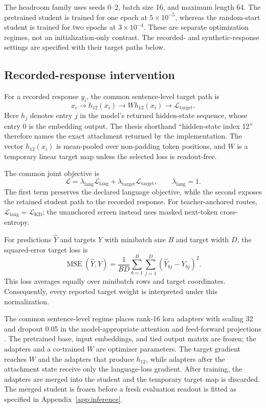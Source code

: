 The headroom family uses seeds 0--2, batch size 16, and maximum length 64.
The pretrained student is trained for one epoch at \(5\times10^{-5}\), whereas the random-start student is trained for two epochs at \(3\times10^{-4}\).
These are separate optimization regimes, not an initialization-only contrast. 
The recorded- and synthetic-response settings are specified with their target paths below.

\subsection{Recorded-response intervention}

For a recorded response \(y_i\), the common sentence-level target path is
\[
  x_i
  \longrightarrow h_{12}(x_i)
  \longrightarrow W h_{12}(x_i)
  \longrightarrow \mathcal L_{\mathrm{target}}.
\]
Here \(h_j\) denotes entry \(j\) in the model's returned hidden-state sequence, whose entry 0 is the embedding output.
The thesis shorthand ``hidden-state index 12'' therefore names the exact attachment returned by the implementation.
The vector \(h_{12}(x_i)\) is mean-pooled over non-padding token positions, and \(W\) is a temporary linear target map unless the selected loss is readout-free.

\begin{samepage}
The common joint objective is
\begin{equation}
  \mathcal L
  =
  \lambda_{\mathrm{lang}}\mathcal L_{\mathrm{lang}}
  +
  \lambda_{\mathrm{target}}\mathcal L_{\mathrm{target}},
  \qquad
  \lambda_{\mathrm{lang}}=1.
  \label{eq:recorded-objective}
\end{equation}
The first term preserves the declared language objective, while the second exposes the retained student path to the recorded response.
For teacher-anchored routes, \(\mathcal L_{\mathrm{lang}}=\mathcal L_{\mathrm{KD}}\); the unanchored screen instead uses masked next-token cross-entropy.
\end{samepage}

For predictions \(\widehat Y\) and targets \(Y\) with minibatch size \(B\) and target width \(D\), the squared-error target loss is
\[
  \operatorname{MSE}(\widehat Y,Y)
  =
  \frac{1}{BD}
  \sum_{b=1}^{B}
  \sum_{j=1}^{D}
  \left(\widehat Y_{bj}-Y_{bj}\right)^2.
\]
This loss averages equally over minibatch rows and target coordinates.
Consequently, every reported target weight is interpreted under this normalization.

The common sentence-level regime places rank-16 \ac{lora} adapters with scaling 32 and dropout 0.05 in the model-appropriate attention and feed-forward projections \autocite{hu2022}. 
The pretrained base, input embeddings, and tied output matrix are frozen; the adapters and a co-trained \(W\) are optimizer parameters.
The target gradient reaches \(W\) and the adapters that produce \(h_{12}\), while adapters after the attachment state receive only the language-loss gradient.
After training, the adapters are merged into the student and the temporary target map is discarded.
The merged student is frozen before a fresh evaluation readout is fitted as specified in Appendix~\ref{app:inference}. 


